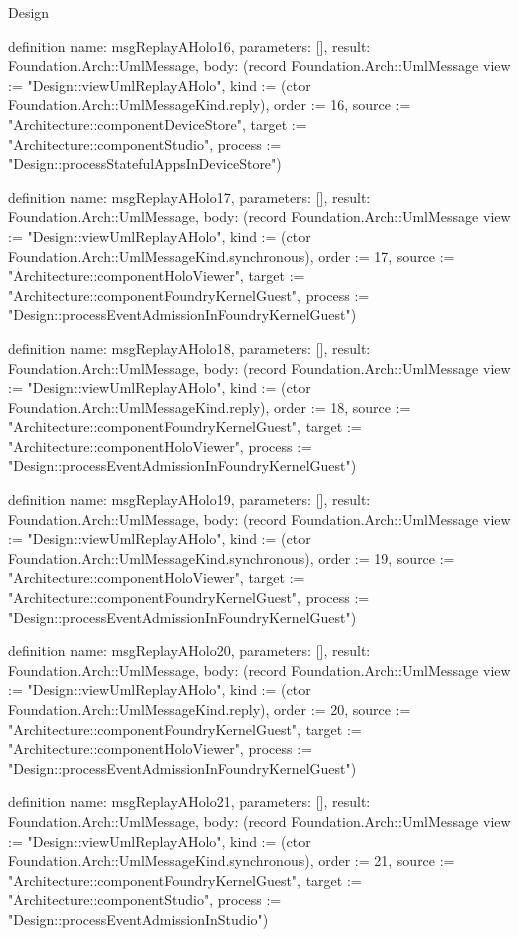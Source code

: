 \begin{lexlean}{Design}
\begin{semanticmodule}
definition{
  name: msgReplayAHolo16,
  parameters: [],
  result: Foundation.Arch::UmlMessage,
  body: (record Foundation.Arch::UmlMessage {view := "Design::viewUmlReplayAHolo", kind := (ctor Foundation.Arch::UmlMessageKind.reply), order := 16, source := "Architecture::componentDeviceStore", target := "Architecture::componentStudio", process := "Design::processStatefulAppsInDeviceStore"})
}

definition{
  name: msgReplayAHolo17,
  parameters: [],
  result: Foundation.Arch::UmlMessage,
  body: (record Foundation.Arch::UmlMessage {view := "Design::viewUmlReplayAHolo", kind := (ctor Foundation.Arch::UmlMessageKind.synchronous), order := 17, source := "Architecture::componentHoloViewer", target := "Architecture::componentFoundryKernelGuest", process := "Design::processEventAdmissionInFoundryKernelGuest"})
}

definition{
  name: msgReplayAHolo18,
  parameters: [],
  result: Foundation.Arch::UmlMessage,
  body: (record Foundation.Arch::UmlMessage {view := "Design::viewUmlReplayAHolo", kind := (ctor Foundation.Arch::UmlMessageKind.reply), order := 18, source := "Architecture::componentFoundryKernelGuest", target := "Architecture::componentHoloViewer", process := "Design::processEventAdmissionInFoundryKernelGuest"})
}

definition{
  name: msgReplayAHolo19,
  parameters: [],
  result: Foundation.Arch::UmlMessage,
  body: (record Foundation.Arch::UmlMessage {view := "Design::viewUmlReplayAHolo", kind := (ctor Foundation.Arch::UmlMessageKind.synchronous), order := 19, source := "Architecture::componentHoloViewer", target := "Architecture::componentFoundryKernelGuest", process := "Design::processEventAdmissionInFoundryKernelGuest"})
}

definition{
  name: msgReplayAHolo20,
  parameters: [],
  result: Foundation.Arch::UmlMessage,
  body: (record Foundation.Arch::UmlMessage {view := "Design::viewUmlReplayAHolo", kind := (ctor Foundation.Arch::UmlMessageKind.reply), order := 20, source := "Architecture::componentFoundryKernelGuest", target := "Architecture::componentHoloViewer", process := "Design::processEventAdmissionInFoundryKernelGuest"})
}

definition{
  name: msgReplayAHolo21,
  parameters: [],
  result: Foundation.Arch::UmlMessage,
  body: (record Foundation.Arch::UmlMessage {view := "Design::viewUmlReplayAHolo", kind := (ctor Foundation.Arch::UmlMessageKind.synchronous), order := 21, source := "Architecture::componentFoundryKernelGuest", target := "Architecture::componentStudio", process := "Design::processEventAdmissionInStudio"})
}


\end{semanticmodule}
\end{lexlean}
